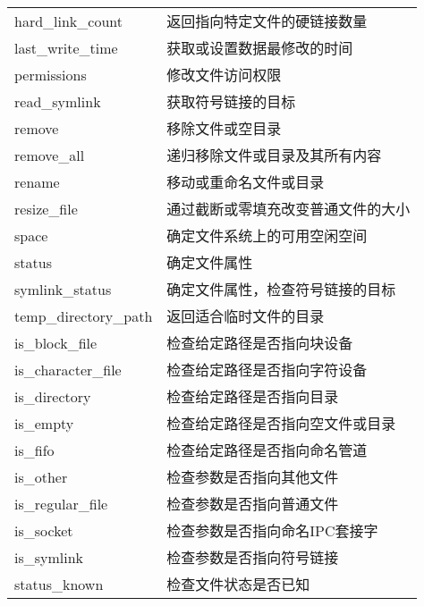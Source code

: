\begin{longtable}{LL}
	hard\_link\_count            & 返回指向特定文件的硬链接数量           \\
	last\_write\_time            & 获取或设置数据最修改的时间             \\
	permissions                  & 修改文件访问权限                       \\
	read\_symlink                & 获取符号链接的目标                     \\
	remove                       & 移除文件或空目录                       \\
	remove\_all                  & 递归移除文件或目录及其所有内容         \\
	rename                       & 移动或重命名文件或目录                 \\
	resize\_file                 & 通过截断或零填充改变普通文件的大小     \\
	space                        & 确定文件系统上的可用空闲空间           \\
	status                       & 确定文件属性                           \\
	symlink\_status              & 确定文件属性，检查符号链接的目标       \\
	temp\_directory\_path        & 返回适合临时文件的目录                 \\
	is\_block\_file              & 检查给定路径是否指向块设备             \\
	is\_character\_file          & 检查给定路径是否指向字符设备           \\
	is\_directory                & 检查给定路径是否指向目录               \\
	is\_empty                    & 检查给定路径是否指向空文件或目录       \\
	is\_fifo                     & 检查给定路径是否指向命名管道           \\
	is\_other                    & 检查参数是否指向其他文件               \\
	is\_regular\_file            & 检查参数是否指向普通文件               \\
	is\_socket                   & 检查参数是否指向命名IPC套接字          \\
	is\_symlink                  & 检查参数是否指向符号链接               \\
	status\_known                & 检查文件状态是否已知                   \\
\end{longtable}

